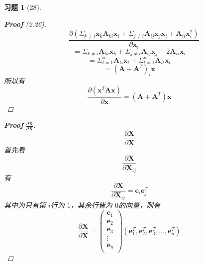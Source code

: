 \documentclass[a4paper, UTF8]{ctexart}
\newtheorem*{exercise}{\textbf{习题}}
\begin{document}
\begin{exercise}[28]
\begin{proof}[\textbf{Proof} (2.26)]
\begin{equation*}
			= \frac{\partial \left( \Sigma_{k\neq i} \mathbf{x}_k \mathbf{A}_{ki} \mathbf{x}_i + \Sigma_{j \neq i} \mathbf{A}_{ij} \mathbf{x}_j \mathbf{x}_i + \mathbf{A}_{ii}\mathbf{x}_i^2 \right)}{\partial \mathbf{x}_i}
		\end{equation*}
		\begin{equation*}
			= \Sigma_{k\neq i}\mathbf{A}_{ki} \mathbf{x}_k + \Sigma_{j\neq i}\mathbf{A}_{ij} \mathbf{x}_j + 2 \mathbf{A}_{ii} \mathbf{x}_i
		\end{equation*}
		\begin{equation*}
			=\Sigma_{t=1}^n \mathbf{A}_{ti} \mathbf{x}_t + \Sigma_{t=1}^n \mathbf{A}_{it} \mathbf{x}_t
		\end{equation*}
		\begin{equation*}
			= \left( \mathbf{A} + \mathbf{A}^T \right)_i \mathbf{x}
		\end{equation*}
		所以有
		\begin{equation*}
			\frac{\partial \left( \mathbf{x}^T \mathbf{A} \mathbf{x} \right)}{\partial \mathbf{x}} = \left( \mathbf{A} + \mathbf{A}^T \right) \mathbf{x}
		\end{equation*}
	\end{proof}
	\begin{proof}[\textbf{Proof} $\frac{\partial \mathbf{X}}{\partial \mathbf{X}}$]
		\begin{equation*}
			\frac{\partial \mathbf{X}}{\partial \mathbf{X}}
		\end{equation*}
		首先看
		\begin{equation*}
			\frac{\partial \mathbf{X}}{\partial \mathbf{X}_{ij}}
		\end{equation*}
		有
		\begin{equation*}
			\frac{\partial \mathbf{X}}{\partial \mathbf{X}_{ij}} = \mathbf{e}_i \mathbf{e}_j^T
		\end{equation*}
		其中为只有第 $i$行为 $1$，其余行皆为 $0$的向量，则有
		\begin{equation*}
			\frac{\partial \mathbf{X}}{\partial \mathbf{X}} = \left(
			\begin{array}{c}
				\mathbf{e}_1 \\
				\mathbf{e}_2 \\
				\mathbf{e}_3 \\
				\vdots       \\
				\mathbf{e}_n \\
			\end{array}
			\right) \left(
			\mathbf{e}_1^T, \mathbf{e}_2^T, \mathbf{e}_3^T, \dots, \mathbf{e}_n^T
			\right)
		\end{equation*}
	\end{proof}
\end{exercise}
\end{document}
